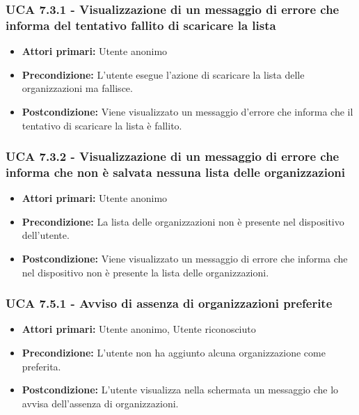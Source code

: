 \subsubsection{UCA 7.3.1 - Visualizzazione di un messaggio di errore che informa del tentativo fallito di scaricare la lista}%
\begin{itemize}
\item \textbf{Attori primari:} Utente anonimo
\item \textbf{Precondizione:} L'utente esegue l'azione di scaricare la lista delle organizzazioni ma fallisce.
\item \textbf{Postcondizione:} Viene visualizzato un messaggio d'errore che informa che il tentativo di scaricare la lista è fallito.

\end{itemize}

\subsubsection{UCA 7.3.2 - Visualizzazione di un messaggio di errore che informa che non è salvata nessuna lista delle organizzazioni}%
\begin{itemize}
	\item \textbf{Attori primari:} Utente anonimo
	\item \textbf{Precondizione:} La lista delle organizzazioni non è presente nel dispositivo dell'utente.
	\item \textbf{Postcondizione:} Viene visualizzato un messaggio di errore che informa che nel dispositivo non è presente la lista delle organizzazioni.
\end{itemize}

\subsubsection{UCA 7.5.1 - Avviso di assenza di organizzazioni preferite}
\begin{itemize}
    \item \textbf{Attori primari:} Utente anonimo, Utente riconosciuto
    \item \textbf{Precondizione:} L'utente non ha aggiunto alcuna organizzazione come preferita.
    \item \textbf{Postcondizione:} L'utente visualizza nella schermata un messaggio che lo avvisa dell'assenza di organizzazioni.
\end{itemize}

